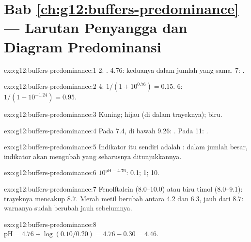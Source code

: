\section*{Bab \ref{ch:g12:buffers-predominance} --- Larutan Penyangga dan Diagram Predominansi}

\begin{solution}{exo:g12:buffers-predominance:1}
 2: .  4.76: keduanya dalam jumlah yang sama.  7:
.
\end{solution}

\begin{solution}{exo:g12:buffers-predominance:2}
 4: $1/(1 + 10^{0.76}) = 0.15$.  6: $1/(1 + 10^{-1.24}) = 0.95$.
\end{solution}

\begin{solution}{exo:g12:buffers-predominance:3}
Kuning; hijau (di dalam trayeknya); biru.
\end{solution}

\begin{solution}{exo:g12:buffers-predominance:4}
Pada  7.4, di bawah 9.26: . Pada  11: .
\end{solution}

\begin{solution}{exo:g12:buffers-predominance:5}
Indikator itu sendiri adalah : dalam jumlah besar,
indikator akan mengubah  yang seharusnya ditunjukkannya.
\end{solution}

\begin{solution}{exo:g12:buffers-predominance:6}
$10^{\mathrm{pH} - 4.76}$: 0.1; 1; 10.
\end{solution}

\begin{solution}{exo:g12:buffers-predominance:7}
Fenolftalein (8.0--10.0) atau biru timol (8.0--9.1): trayeknya mencakup
8.7. Merah metil berubah antara 4.2 dan 6.3, jauh dari 8.7: warnanya
sudah berubah jauh sebelumnya.
\end{solution}

\begin{solution}{exo:g12:buffers-predominance:8}
$\mathrm{pH} = 4.76 + \log(0.10/0.20) = 4.76 - 0.30 = 4.46$.
\end{solution}

